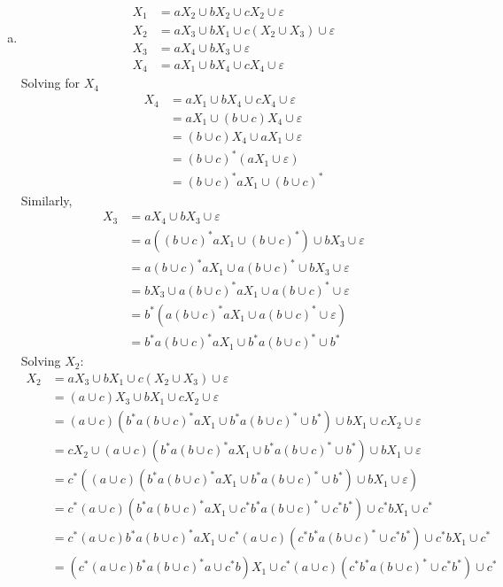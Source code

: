 \begin{solution}
    \begin{enumerate}[(a)]
        \item 
        
        \begin{align*}
            X_1 &= aX_2\cup bX_2\cup cX_2\cup\varepsilon\\
            X_2 &= aX_3\cup bX_1 \cup c(X_2\cup X_3)\cup\varepsilon\\
            X_3 &= aX_4\cup bX_3\cup\varepsilon\\
            X_4 &= aX_1\cup bX_4\cup cX_4\cup\varepsilon  
        \end{align*}
        Solving for $X_4$ 
        \begin{align*}
            X_4 &= aX_1\cup bX_4\cup cX_4\cup\varepsilon\\
                &= aX_1\cup (b\cup c)X_4\cup\varepsilon\\
                &= (b\cup c)X_4\cup aX_1\cup\varepsilon\\
                &= (b\cup c)^*(aX_1\cup\varepsilon)\\
                &= (b\cup c)^*aX_1\cup (b\cup c)^*
        \end{align*}
    Similarly, 
        \begin{align*}
            X_3 &= aX_4\cup bX_3\cup\varepsilon\\
                &= a\left((b\cup c)^*aX_1\cup (b\cup c)^*\right)\cup bX_3\cup\varepsilon\\
                &= a(b\cup c)^*aX_1\cup a(b\cup c)^*\cup bX_3\cup\varepsilon\\
                &= bX_3\cup a(b\cup c)^*aX_1\cup a(b\cup c)^*\cup\varepsilon\\
                &= b^*(a(b\cup c)^*aX_1\cup a(b\cup c)^*\cup\varepsilon)\\
                &= b^*a(b\cup c)^*aX_1\cup b^*a(b\cup c)^*\cup b^*
        \end{align*}
    Solving $X_2$:
    \begin{align*}
        X_2 &= aX_3\cup bX_1 \cup c(X_2\cup X_3)\cup\varepsilon\\
            &= (a\cup c)X_3 \cup bX_1 \cup cX_2\cup\varepsilon\\
            &= (a\cup c)(b^*a(b\cup c)^*aX_1\cup b^*a(b\cup c)^*\cup b^*)\cup bX_1 \cup cX_2\cup\varepsilon\\
            &= cX_2\cup (a\cup c)(b^*a(b\cup c)^*aX_1\cup b^*a(b\cup c)^*\cup b^*)\cup bX_1\cup\varepsilon\\
            &= c^*((a\cup c)(b^*a(b\cup c)^*aX_1\cup b^*a(b\cup c)^*\cup b^*)\cup bX_1\cup\varepsilon)\\
            &= c^*(a\cup c)(b^*a(b\cup c)^*aX_1\cup c^*b^*a(b\cup c)^*\cup c^*b^*)\cup c^*bX_1\cup c^*\\
            &= c^*(a\cup c)b^*a(b\cup c)^*aX_1\cup c^*(a\cup c)(c^*b^*a(b\cup c)^*\cup c^*b^*)\cup c^*bX_1\cup c^*\\
            &= (c^*(a\cup c)b^*a(b\cup c)^*a\cup c^*b)X_1\cup c^*(a\cup c)(c^*b^*a(b\cup c)^*\cup c^*b^*)\cup c^*
    \end{align*}


\end{enumerate}
\end{solution}
